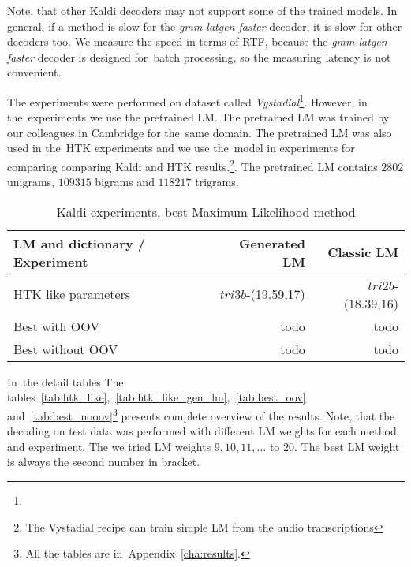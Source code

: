 Note, that other Kaldi decoders may not support some of the trained models.
In general, if a method is slow for the {\it gmm-latgen-faster}\/ decoder, it is slow for other decoders too.
We measure the speed in terms of \ac{RTF}, because the {\it gmm-latgen-faster}\/ decoder is designed for~batch 
processing, so the measuring latency is not convenient.


The experiments were performed on dataset called {\it Vystadial}\footnote{}.
However, in the~experiments we use the pretrained \ac{LM}.
The pretrained \acl{LM} was trained by our colleagues in Cambridge for the~same domain.
The pretrained \ac{LM} was also used in the~\ac{HTK} experiments and we use the~model in experiments 
for comparing comparing Kaldi and \ac{HTK} results.\footnote{The Vystadial recipe can train simple \ac{LM} from the audio transcriptions}.
The pretrained \ac{LM} contains $2802$ unigrams, $109315$ bigrams and
$118217$ trigrams. 


\begin{table}[!htp]\label{tab:exp_best}
\begin{tabular}{lrr}
\hline
\parbox[t]{6.0cm}{\ac{LM} and dictionary / Experiment} & Generated \acs{LM}  & Classic \ac{LM} \\
\hline
\ac{HTK} like parameters    &  $tri3b$-(19.59,17) & $tri2b$-(18.39,16) \\
Best with OOV               & todo & todo \\
Best without OOV            & todo & todo \\
\hline
\end{tabular}
\caption{Kaldi experiments, best Maximum Likelihood method}
\end{table}


In~the detail tables 
The tables~\ref{tab:htk_like},~\ref{tab:htk_like_gen_lm},~\ref{tab:best_oov} 
and~\ref{tab:best_nooov}\footnote{All the tables are in~Appendix~\ref{cha:results}.} presents complete overview of the results. 
Note, that the decoding on test data was performed with different \ac{LM} weights for each method and experiment. 
The we tried \ac{LM} weights $9, 10, 11, ...$ to $20$. 
The best \ac{LM} weight is always the second number in bracket.

